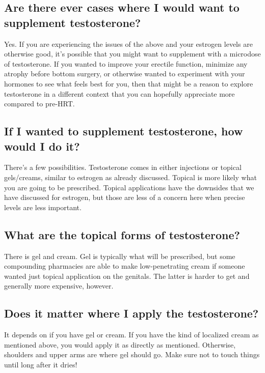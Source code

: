 \documentclass{article}
\begin{document}
\subsection{Are there ever cases where I would want to supplement testosterone?}\label{9-2}

Yes. If you are experiencing the issues of the above and your estrogen levels are otherwise good, it’s possible that you might want to supplement with a microdose of testosterone. If you wanted to improve your erectile function, minimize any atrophy before bottom surgery, or otherwise wanted to experiment with your hormones to see what feels best for you, then that might be a reason to explore testosterone in a different context that you can hopefully appreciate more compared to pre-HRT.

\subsection{If I wanted to supplement testosterone, how would I do it?}

There’s a few possibilities. Testosterone comes in either injections or topical gels/creams, similar to estrogen as already discussed. Topical is more likely what you are going to be prescribed. Topical applications have the downsides that we have discussed for estrogen, but those are less of a concern here when precise levels are less important.

\subsection{What are the topical forms of testosterone?}

There is gel and cream. Gel is typically what will be prescribed, but some compounding pharmacies are able to make low-penetrating cream if someone wanted just topical application on the genitals. The latter is harder to get and generally more expensive, however.

\subsection{Does it matter where I apply the testosterone?}

It depends on if you have gel or cream. If you have the kind of localized cream as mentioned above, you would apply it as directly as mentioned. Otherwise, shoulders and upper arms are where gel should go. Make sure not to touch things until long after it dries!
\end{document}
